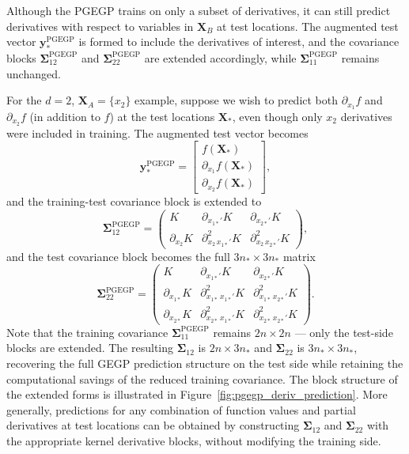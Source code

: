 \documentclass[12pt]{article}
\begin{document}
Although the PGEGP trains on only a subset of derivatives, it can still predict derivatives with respect to variables in $\mathbf{X}_B$ at test locations. The augmented test vector $\mathbf{y}^{\text{PGEGP}}_*$ is formed to include the derivatives of interest, and the covariance blocks $\boldsymbol{\Sigma}_{12}^{\text{PGEGP}}$ and $\boldsymbol{\Sigma}_{22}^{\text{PGEGP}}$ are extended accordingly, while $\boldsymbol{\Sigma}_{11}^{\text{PGEGP}}$ remains unchanged.

For the $d=2$, $\mathbf{X}_A = \{x_2\}$ example, suppose we wish to predict both $\partial_{x_1} f$ and $\partial_{x_2} f$ (in addition to $f$) at the test locations $\mathbf{X}_*$, even though only $x_2$ derivatives were included in training. The augmented test vector becomes
\begin{equation}
	\mathbf{y}^{\text{PGEGP}}_* = \begin{bmatrix} f(\mathbf{X}_*) \\ \partial_{x_1} f(\mathbf{X}_*) \\ \partial_{x_2} f(\mathbf{X}_*) \end{bmatrix},
\end{equation}
and the training-test covariance block is extended to
\begin{equation}
	\boldsymbol{\Sigma}_{12}^{\text{PGEGP}} =
	\begin{pmatrix}
		K & \partial_{x_{1*}'} K & \partial_{x_{2*}'} K \\[8pt]
		\partial_{x_2} K & \partial^2_{x_2\,x_{1*}'} K & \partial^2_{x_2\,x_{2*}'} K
	\end{pmatrix},
\end{equation}
and the test covariance block becomes the full $3n_* \times 3n_*$ matrix
\begin{equation}
	\boldsymbol{\Sigma}_{22}^{\text{PGEGP}} =
	\begin{pmatrix}
		K & \partial_{x_{1*}'} K & \partial_{x_{2*}'} K \\[8pt]
		\partial_{x_{1*}} K & \partial^2_{x_{1*}\,x_{1*}'} K & \partial^2_{x_{1*}\,x_{2*}'} K \\[8pt]
		\partial_{x_{2*}} K & \partial^2_{x_{2*}\,x_{1*}'} K & \partial^2_{x_{2*}\,x_{2*}'} K
	\end{pmatrix}.
\end{equation}
Note that the training covariance $\boldsymbol{\Sigma}_{11}^{\text{PGEGP}}$ remains $2n \times 2n$ — only the test-side blocks are extended. The resulting $\boldsymbol{\Sigma}_{12}$ is $2n \times 3n_*$ and $\boldsymbol{\Sigma}_{22}$ is $3n_* \times 3n_*$, recovering the full GEGP prediction structure on the test side while retaining the computational savings of the reduced training covariance. The block structure of the extended forms is illustrated in Figure~\ref{fig:pgegp_deriv_prediction}. More generally, predictions for any combination of function values and partial derivatives at test locations can be obtained by constructing $\boldsymbol{\Sigma}_{12}$ and $\boldsymbol{\Sigma}_{22}$ with the appropriate kernel derivative blocks, without modifying the training side.
\end{document}
